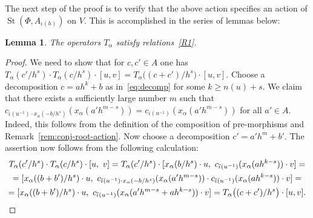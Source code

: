 \documentclass[oneside, 11pt]{amsart} \pdfoutput=1
\newcommand{\St}{\mathop{\mathrm{St}}\nolimits}
\numberwithin{equation}{section}
\newtheorem{lemma}{Lemma} \numberwithin{lemma}{section}
\theoremstyle{definition}
\begin{document}
The next step of the proof is to verify that the above action specifies an action of $\St(\Phi, A_{\iota(h)})$ on $V$.
This is accomplished in the series of lemmas below:

\begin{lemma}\label{lem:R1} The operators $T_\alpha$ satisfy relations~\eqref{R1}. \end{lemma}
\begin{proof}
We need to show that for $c, c' \in A$ one has $\textstyle
T_\alpha(c'/{h^s}) \cdot T_\alpha(c/h^s) \cdot [u, v] = T_\alpha\bigl((c+c')/h^s\bigr) \cdot [u, v].$
Choose a decomposition $c = ah^k + b$ as in~\eqref{eq:decomp} for some $k \geq n(u) + s$.
We claim that there exists a sufficiently large number $m$ such that $c_{\overline{\iota}(u^{-1}) \cdot x_\alpha(-b/h^s)}(x_\alpha(a'h^{m-s})) = c_{\overline{\iota}(u^{-1})}(x_\alpha(a'h^{m-s}))$ for all $a'\in A$. Indeed, this follows from the definition of the composition of pre-morphisms and Remark~\ref{rem:conj-root-action}. 
Now choose a decomposition $c' = a' h^m + b'$.
The assertion now follows from the following calculation:
\begin{multline*}
 T_\alpha(c'/{h^s}) \cdot T_\alpha(c/h^s) \cdot [u,\ v] = T_\alpha(c'/h^s) \cdot [x_\alpha(b/h^s)\cdot u,\ c_{\overline{\iota}(u^{-1})}(x_\alpha(ah^{k-s})) \cdot v] = \\
 = [x_\alpha((b + b')/h^s)\cdot u,\ c_{\overline{\iota}(u^{-1}) \cdot x_\alpha(-b/h^s)}(x_\alpha(a'h^{m-s})) \cdot c_{\overline{\iota}(u^{-1})}(x_\alpha(ah^{k-s})) \cdot v] = \\ = [x_\alpha((b + b')/h^s)\cdot u,\  c_{\overline{\iota}(u^{-1})}(x_\alpha(a'h^{m-s} + ah^{k-s})) \cdot v] = T_\alpha\bigl((c+c')/h^s\bigr) \cdot [u, v]. \qedhere
\end{multline*}
\end{proof}
\end{document}
